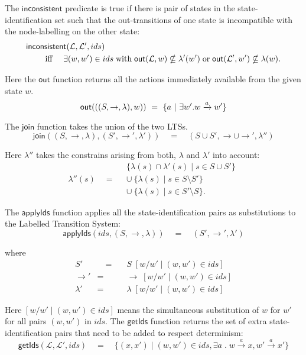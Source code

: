 \NI The $\mathsf{inconsistent}$ predicate is true if there is pair of
states in the state-identification set such that the out-transitions
of one state is incompatible with the node-labelling on the other
state:
\begin{eqnarray*}
  \lefteqn{\mathsf{inconsistent}(\mathcal{L}, \mathcal{L}', ids)}\qquad
     \\
     &\text{ iff }& \exists (w,w') \in ids \; \text{with} \; \mathsf{out}(\mathcal{L},w) \nsubseteq \lambda'(w') \; \text{or} \; \mathsf{out}(\mathcal{L}',w') \nsubseteq \lambda(w).
\end{eqnarray*}
 
\NI Here the $\mathsf{out}$ function returns all the actions
immediately available from the given state $w$.
\[
  \mathsf{out}(((S,\rightarrow,\lambda),w)) 
     \ =\  \{ a \ | \  \exists w' . w \xrightarrow{a} w'\} 
\]

\NI The $\mathsf{join}$ function takes the union of the two LTSs.
\[
   \mathsf{join}((S, \rightarrow,\lambda), (S', \rightarrow', \lambda')) 
      \quad=\quad
   (S \cup S', \rightarrow \cup \rightarrow', \lambda'')
\]

\NI Here $\lambda''$ takes the constrains arising from both, $\lambda$ and
$\lambda'$ into account: 
\[
   \lambda''(s) 
      \quad = \quad
   \begin{array}{l}
      \{\lambda(s) \cap \lambda'(s) \; | \; s \in S \cup S'\} \\ \cup \ 
      \{\lambda(s)\; |\; s\in S \setminus S' \} \\ \cup \ 
      \{\lambda(s)\; |\; s\in S' \setminus S \}. 
   \end{array}
\]

\NI The $\mathsf{applyIds}$ function applies all the
state-identification pairs as substitutions to the Labelled Transition
System:
\[
   \mathsf{applyIds}(ids, (S, \rightarrow, \lambda)) 
      \quad=\quad 
   (S', \rightarrow', \lambda')
\]

\NI where
\begin{eqnarray*}
  S' &\quad =\quad & S \; [ w / w' \; | \; (w,w') \in ids] \\
  \rightarrow' & = & \rightarrow \; [ w / w' \; | \; (w,w') \in ids] \\
  \lambda' & = & \lambda \; [ w / w' \; | \; (w,w') \in ids]
\end{eqnarray*}

\NI Here $[ w / w' \; | \; (w,w') \in ids]$ means the simultaneous
substitution of $w$ for $w'$ for all pairs $(w, w')$ in $ids$.  The
$\mathsf{getIds}$ function returns the set of extra
state-identification pairs that need to be added to respect
determinism:
\[
   \mathsf{getIds}(\mathcal{L}, \mathcal{L}', ids) 
      \quad=\quad 
   \{(x,x') \; | \; (w,w') \in ids, \exists a \; . \; w \xrightarrow{a} x, w' \xrightarrow{a} x'\}
\]

